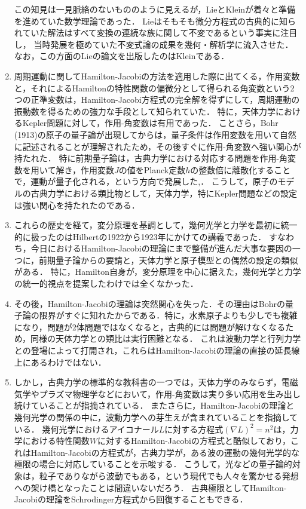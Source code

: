 \documentclass[uplatex, dvipdfmx]{jsarticle}
\begin{document}
\begin{enumerate}
    この知見は一見脈絡のないもののように見えるが，LieとKleinが着々と準備を進めていた数学理論であった．
    Lieはそもそも微分方程式の古典的に知られていた解法はすべて変換の連続な族に関して不変であるという事実に注目し，
    当時発展を極めていた不変式論の成果を幾何・解析学に流入させた．
    なお，この方面のLieの論文を出版したのはKleinである\cite{Bourbaki}．
    \item 周期運動に関してHamilton-Jacobiの方法を適用した際に出てくる，作用変数と，それによるHamiltonの特性関数の偏微分として得られる角変数という2つの正準変数は，Hamilton-Jacobi方程式の完全解を得ずにして，周期運動の振動数を得るための強力な手段として知られていた．
    特に，天体力学におけるKepler問題に対して，作用-角変数は有用であった．
    ことさら，Bohr (1913)の原子の量子論が出現してからは，量子条件は作用変数を用いて自然に記述されることが理解されたため，その後すぐに作用-角変数へ強い関心が持たれた．
    特に前期量子論は，古典力学における対応する問題を作用-角変数を用いて解き，作用変数$J$の値をPlanck定数$h$の整数倍に離散化することで，運動が量子化される，という方向で発展した\cite{Goldstein},\cite{Born25}．
    こうして，原子のモデルの古典力学における類比物として，天体力学，特にKepler問題などの設定は強い関心を持たれたのである．
    \item これらの歴史を経て，変分原理を基調として，幾何光学と力学を最初に統一的に扱ったのはHilbertの1922から1923年にかけての講義であった．
    すなわち，今日におけるHamilton-Jacobiの理論にまで整備が進んだ大事な要因の一つに，前期量子論からの要請と，天体力学と原子模型との偶然の設定の類似がある．
    特に，Hamilton自身が，変分原理を中心に据えた，幾何光学と力学の統一的視点を提案したわけでは全くなかった．
    \item その後，Hamilton-Jacobiの理論は突然関心を失った．その理由はBohrの量子論の限界がすぐに知れたからである．特に，水素原子よりも少しでも複雑になり，問題が2体問題ではなくなると，古典的には問題が解けなくなるため，同様の天体力学との類比は実行困難となる．
    これは波動力学と行列力学との登場によって打開され，これらはHamilton-Jacobiの理論の直接の延長線上にあるわけではない．
    \item しかし，古典力学の標準的な教科書の一つ\cite{Goldstein}では，天体力学のみならず，電磁気学やプラズマ物理学などにおいて，作用-角変数は実り多い応用を生み出し続けていることが指摘されている．
    またさらに，Hamilton-Jacobiの理論と幾何光学の関係の中に，波動力学への芽生えが含まれていることを指摘している．
    幾何光学におけるアイコナール$L$に対する方程式$(\nabla L)^2=n^2$は，力学における特性関数$W$に対するHamilton-Jacobiの方程式と酷似しており，これはHamilton-Jacobiの方程式が，古典力学が，ある波の運動の幾何光学的な極限の場合に対応していることを示唆する．
    こうして，光などの量子論的対象は，粒子でありながら波動でもある，という現代でも人々を驚かせる発想への架け橋となったことは間違いないだろう．
    古典極限としてHamilton-Jacobiの理論をSchrodinger方程式から回復することもできる．
\end{enumerate}
\end{document}
